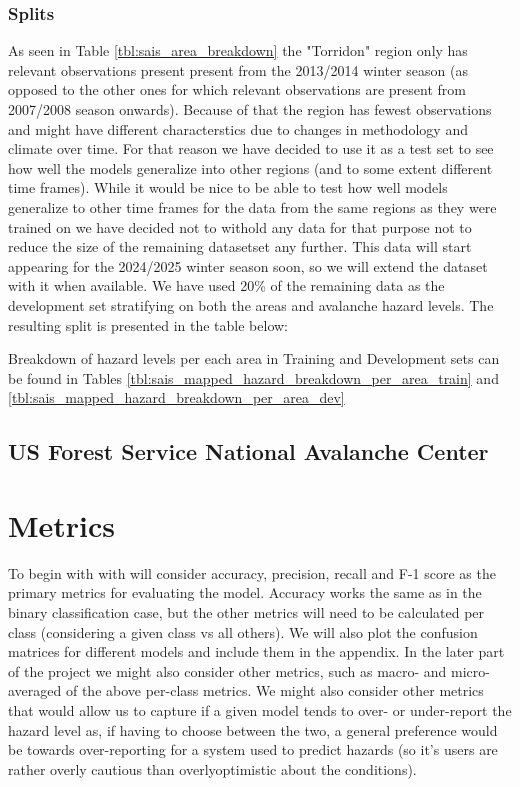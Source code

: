 \documentclass{article}
\begin{document}
\subsubsection{Splits}
	As seen in Table \ref{tbl:sais_area_breakdown} the "Torridon" region only has relevant observations present present from the 2013/2014 winter season (as opposed to the other ones for which relevant observations are present from 2007/2008 season onwards). 
	Because of that the region has fewest observations and might have different characterstics due to changes in methodology and climate over time. For that reason we have decided to use it as a test set to see how well the models generalize into other regions (and to some extent different time frames).
	While it would be nice to be able to test how well models generalize to other time frames for the data from the same regions as they were trained on we have decided not to withold any data for that purpose not to reduce the size of the remaining datasetset any further. This data will start appearing for the 2024/2025 winter season soon, so we will extend the dataset with it when available.
	\newline
	We have used 20\% of the remaining data as the development set stratifying on both the areas and avalanche hazard levels. The resulting split is presented in the table below:

	

	Breakdown of hazard levels per each area in Training and Development sets can be found in Tables \ref{tbl:sais_mapped_hazard_breakdown_per_area_train} and \ref{tbl:sais_mapped_hazard_breakdown_per_area_dev}

\subsection{US Forest Service National Avalanche Center}

\section{Metrics}

	To begin with with will consider accuracy, precision, recall and F-1 score as the primary metrics for evaluating the model. Accuracy works the same as in the binary classification case, but the other metrics will need to be calculated per class (considering a given class vs all others). We will also plot the confusion matrices for different models and include them in the appendix.
	In the later part of the project we might also consider other metrics, such as macro- and micro-averaged of the above per-class metrics.
	\newline
	We might also consider other metrics that would allow us to capture if a given model tends to over- or under-report the hazard level as, if having to choose between the two, a general 
	preference would be towards over-reporting for a system used to predict hazards (so it's users are rather overly cautious than overlyoptimistic about the conditions). 
\end{document}
